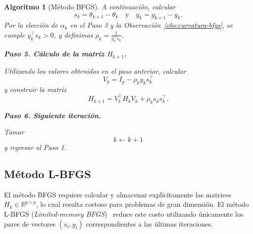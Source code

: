 \documentclass[a4paper,openany,oneside,10pt]{report}
\theoremstyle{pnlTeorema}
\theoremstyle{pnlDefinicion}
\newtheorem{algoritmo}{Algoritmo}[section]
\theoremstyle{pnlObservacion}
\begin{document}
\begin{algoritmo}[Método BFGS]
A continuación, calcular
\[
        s_k=\theta_{k+1}-\theta_k \quad \text{y} \quad y_k=g_{k+1}-g_k.       
\]
Por la elección de \(\alpha_k\) en el Paso 3 y la Observación~\ref{obs:curvatura-bfgs}, se cumple $y_k^\top s_k>0$, y definimos $\rho_k=\frac{1}{y_k^\top s_k}$.
\medskip

\noindent\textbf{Paso 5. Cálculo de la matriz $H_{k+1}$.}

Utilizando los valores obtenidos en el paso anterior, calcular
\[
    V_k=I_p-\rho_k y_k s_k^\top
\]
y construir la matriz
\[
    H_{k+1}
    =
    V_k^\top H_k V_k+\rho_k s_k s_k^\top.
\]

\medskip

\noindent\textbf{Paso 6. Siguiente iteración.}

Tomar
\[
    k\leftarrow k+1
\]
y regresar al Paso 1.

\end{algoritmo}

\subsection{Método L-BFGS}
\label{subsec:metodo-lbfgs}

El método BFGS requiere calcular y almacenar explícitamente
las matrices $H_k\in\mathbb{R}^{p\times p}$, lo cual resulta
costoso para problemas de gran dimensión. El método L-BFGS
(\textit{Limited-memory BFGS})~\cite{nocedal1980,liuNocedal1989} reduce este costo utilizando
únicamente los pares de vectores $(s_i,y_i)$ correspondientes
a las últimas iteraciones.
\end{document}
